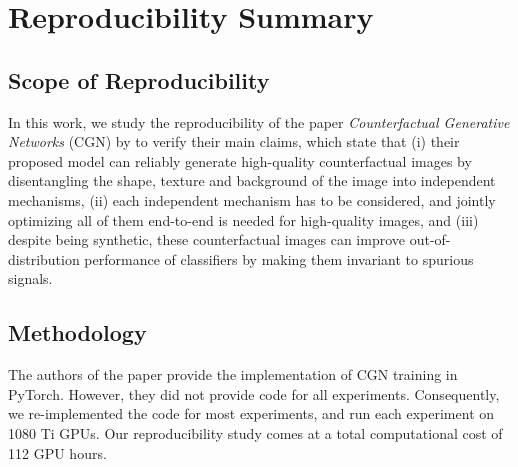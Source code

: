 \section{Reproducibility Summary}


\subsection*{Scope of Reproducibility}
In this work, we study the reproducibility of the paper \emph{Counterfactual Generative Networks} (CGN) by \citeauthor{Sauer2021ICLR} to verify their main claims, which state that
(i) their proposed model can reliably generate high-quality counterfactual images by disentangling the shape, texture and background of the image into independent mechanisms,
(ii) each independent mechanism has to be considered, and jointly optimizing all of them end-to-end is needed for high-quality images, and
(iii) despite being synthetic, these counterfactual images can improve out-of-distribution performance of classifiers by making them invariant to spurious signals.

\subsection*{Methodology}
The authors of the paper provide the implementation of CGN training in PyTorch. However, they did not provide code for all experiments. Consequently, we re-implemented the code for most experiments, and run each experiment on 1080 Ti GPUs. Our reproducibility study comes at a total computational cost of 112 GPU hours.

